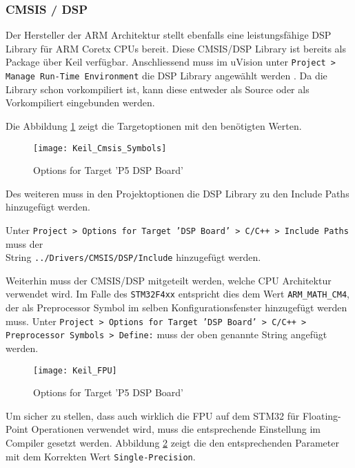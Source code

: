 \subsubsection{CMSIS / DSP}
\label{sec:CMSISDSP}

Der Hersteller der ARM Architektur stellt ebenfalls eine leistungsfähige DSP Library für ARM Coretx CPUs bereit.
Diese CMSIS/DSP Library ist bereits als Package über Keil verfügbar.
Anschliessend muss im uVision unter \texttt{Project > Manage Run-Time Environment} die DSP Library angewählt werden \cite{enable-cmsis-dsp-lib}.
Da die Library schon vorkompiliert ist, kann diese entweder als Source oder als Vorkompiliert eingebunden werden.

Die Abbildung \ref{pic:Keil_Cmsis_Symbols} zeigt die Targetoptionen mit den benötigten Werten.

\begin{figure}[H]
	\centering
	\texttt{[image: Keil\_Cmsis\_Symbols]}
	\caption{Options for Target 'P5 DSP Board'}
	\label{pic:Keil_Cmsis_Symbols}
\end{figure}

Des weiteren muss in den Projektoptionen die DSP Library zu den Include Paths hinzugefügt werden.

Unter \texttt{Project > Options for Target 'DSP Board' > C/C++ > Include Paths} muss der \\
String \texttt{../Drivers/CMSIS/DSP/Include} hinzugefügt werden.

Weiterhin muss der CMSIS/DSP mitgeteilt werden, welche CPU Architektur verwendet wird. Im Falle des \texttt{STM32F4xx} entspricht dies dem Wert \texttt{ARM\_MATH\_CM4}, der als Preprocessor Symbol im selben Konfigurationsfenster hinzugefügt werden muss.
Unter \texttt{Project > Options for Target 'DSP Board' > C/C++ > Preprocessor Symbols > Define:} muss der oben genannte String angefügt werden.


\begin{figure}[H]
	\centering
	\texttt{[image: Keil\_FPU]}
	\caption{Options for Target 'P5 DSP Board'}
	\label{pic:Keil_FPU}
\end{figure}

Um sicher zu stellen, dass auch wirklich die FPU auf dem STM32 für Floating-Point Operationen verwendet wird, muss die entsprechende Einstellung im Compiler gesetzt werden.
Abbildung \ref{pic:Keil_FPU} zeigt die den entsprechenden Parameter mit dem Korrekten Wert \texttt{Single-Precision}.


